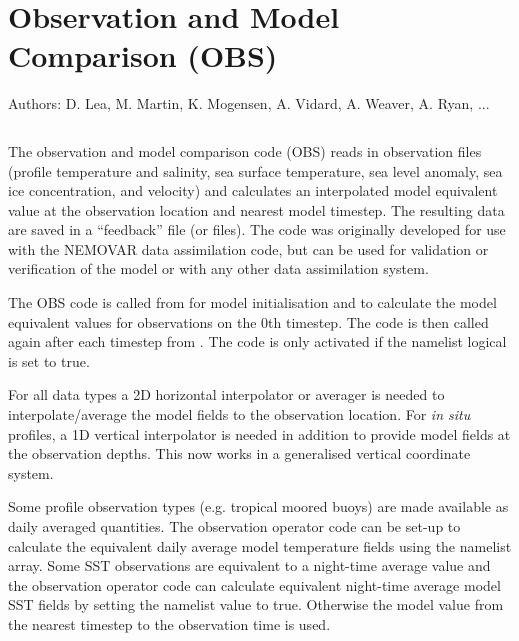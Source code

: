 \documentclass[../tex_main/NEMO_manual]{subfiles}
\begin{document}
\chapter{Observation and Model Comparison (OBS)}
\label{chap:OBS}

Authors: D. Lea, M. Martin, K. Mogensen, A. Vidard, A. Weaver, A. Ryan, ...   %

\minitoc


\newpage
$\ $\newline    %

The observation and model comparison code (OBS) reads in observation files (profile
temperature and salinity, sea surface temperature, sea level anomaly, sea ice concentration,
and velocity) and calculates  an interpolated model equivalent value at the observation
location and nearest model timestep. The resulting data are saved in a ``feedback'' file (or
files). The code was originally developed for use with the NEMOVAR data assimilation code, but
can be used for validation or verification of the model or with any other data assimilation system.

The OBS code is called from  for model initialisation and to calculate the model
equivalent values for observations on the 0th timestep. The code is then called again after
each timestep from . The code is only activated if the namelist logical 
is set to true.

For all data types a 2D horizontal interpolator or averager is needed to interpolate/average the model fields to
the observation location. For {\em in situ} profiles, a 1D vertical interpolator is needed in
addition to provide model fields at the observation depths. This now works in a generalised vertical
coordinate system. 

Some profile observation types (e.g. tropical moored buoys) are made available as daily averaged quantities.
The observation operator code can be set-up to calculate the equivalent daily average model temperature fields
using the  namelist array. Some SST observations are equivalent to a night-time
average value and the observation operator code can calculate equivalent night-time average model SST fields by
setting the namelist value  to true. Otherwise the model value from the nearest timestep to the
observation time is used.
\end{document}
